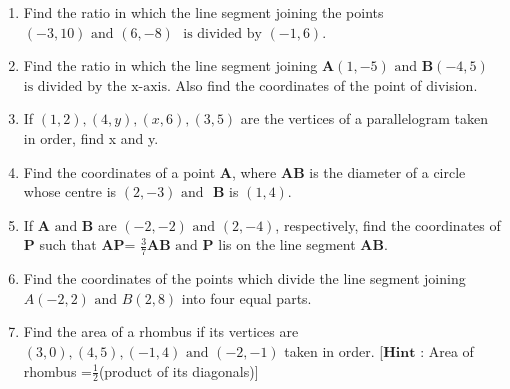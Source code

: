 \documentclass[12pt]{article}
\let\vec\mathbf
\begin{document}
\begin{enumerate}
\item Find the ratio in which the line segment joining the points $(-3,10) \text{ and } (6,-8)$ $\text{ is divided by } (-1,6)$.
\item Find the ratio in which the line segment joining $\vec{A}(1,-5) \text{ and } \vec{B}(-4,5)$ $ \text{is divided by the x-axis}$. Also find the coordinates of the point of division.
\item If $(1,2), (4,y), (x,6), (3,5)$ are the vertices of a parallelogram taken in order, find x and y.
\item Find the coordinates of a point $\vec{A}$, where $\vec{AB}$ is the diameter of a circle whose centre is $(2,-3) \text{ and }$ $\vec{B}$ is $(1,4)$.
\item If $\vec{A} \text{ and } \vec{B}$ are $(-2,-2) \text{ and } (2,-4)$, respectively, find the coordinates of $\vec{P}$ such that $\vec{AP}$= \(\displaystyle \frac{3}{7}\)$\vec{AB} \text{ and } \vec{P}$ lis on the line segment $\vec{AB}$.
\item Find the coordinates of the points which divide the line segment joining $A(-2,2) \text{ and } B(2,8)$ into four equal parts.
\item Find the area of a rhombus if its vertices are $(3,0), (4,5), (-1,4) \text{ and } (-2,-1)$ taken in order. [$\vec{Hint}$ : Area of rhombus =\(\displaystyle \frac{1}{2}\)(product of its diagonals)]

\end{enumerate}
\end{document}
